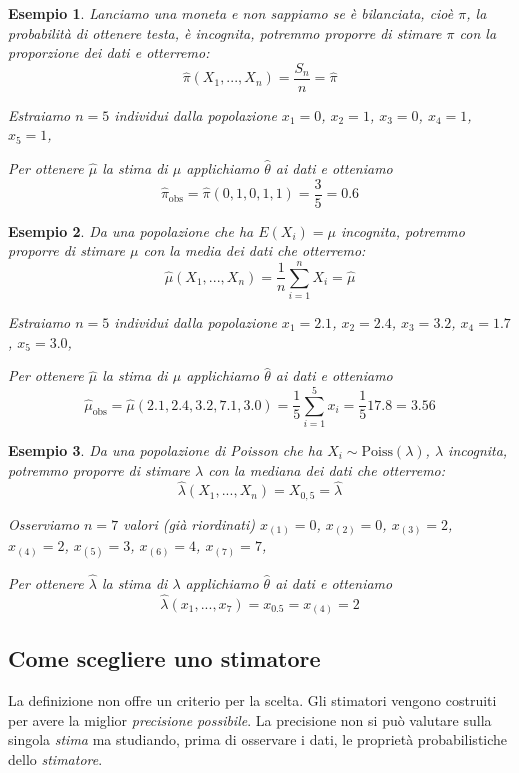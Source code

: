 \documentclass[
  11pt,
]{book}
\theoremstyle{mytheoremstyle}
\theoremstyle{mydefstyle}
\newtheorem{example}{{Esempio}}[section]
\begin{document}
\begin{example}
Lanciamo una moneta e non sappiamo se è bilanciata, cioè \(\pi\), la probabilità di ottenere testa, è incognita, potremmo proporre di \emph{stimare} \(\pi\) con la proporzione dei dati e \emph{otterremo}:
\[
\hat \pi(X_1,...,X_n)=\frac {S_n} n =\hat\pi
\]

Estraiamo \(n=5\) individui dalla popolazione \(x_1=0\), \(x_2=1\), \(x_3=0\), \(x_4=1\), \(x_5=1\),

Per ottenere \(\hat\mu\) la stima di \(\mu\) applichiamo \(\hat\theta\) ai dati e otteniamo
\[
\hat\pi_\text{obs}=\hat\pi(0,1,0,1,1) = \frac 3 5=0.6
\]
\end{example}

\begin{example}
Da una popolazione che ha \(E(X_i)=\mu\) incognita, potremmo proporre di \emph{stimare} \(\mu\) con la media dei dati che \emph{otterremo}:
\[\hat \mu(X_1,...,X_n)=\frac 1 n \sum_{i=1}^n X_i=\hat \mu\]

Estraiamo \(n=5\) individui dalla popolazione \(x_1=2.1\), \(x_2=2.4\), \(x_3=3.2\), \(x_4=1.7\), \(x_5=3.0\),

Per ottenere \(\hat\mu\) la stima di \(\mu\) applichiamo \(\hat\theta\) ai dati e otteniamo
\[
\hat\mu_\text{obs}=\hat\mu(2.1,2.4,3.2,7.1,3.0) = \frac 1 5\sum_{i=1}^5x_i=\frac 1 5 17.8=3.56
\]
\end{example}

\begin{example}
Da una popolazione di Poisson che ha \(X_i\sim\text{Poiss}(\lambda)\), \(\lambda\) incognita, potremmo proporre di \emph{stimare} \(\lambda\) con la mediana dei dati che \emph{otterremo}:
\[\hat\lambda(X_1,...,X_n)=X_{0,5}=\hat\lambda\]

Osserviamo \(n=7\) valori (già riordinati)
\(x_{(1)}=0\), \(x_{(2)}=0\), \(x_{(3)}=2\), \(x_{(4)}=2\), \(x_{(5)}=3\), \(x_{(6)}=4\), \(x_{(7)}=7\),

Per ottenere \(\hat\lambda\) la stima di \(\lambda\) applichiamo \(\hat\theta\) ai dati e otteniamo
\[
\hat\lambda(x_1,...,x_7) = x_{0.5}=x_{(4)}=2
\]
\end{example}

\subsection{Come scegliere uno stimatore}\label{come-scegliere-uno-stimatore}

La definizione non offre un criterio per la scelta.
Gli stimatori vengono costruiti per avere la miglior \emph{precisione possibile}.
La precisione non si può valutare sulla singola \emph{stima} ma studiando,
prima di osservare i dati, le proprietà probabilistiche dello \emph{stimatore}.
\end{document}
